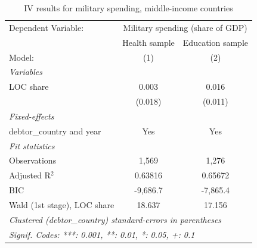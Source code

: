 
\begin{table}[htbp]
   \caption{\label{tab:results_iv_unrel_outcome_other} IV results for military spending, middle-income countries}
   \centering
   \begin{tabular}{lcc}
      \tabularnewline \midrule \midrule
      Dependent Variable: & \multicolumn{2}{c}{Military spending (share of GDP)}\\
                                  & Health sample & Education sample \\   
      Model:                      & (1)           & (2)\\  
      \midrule
      \emph{Variables}\\
      LOC share                   & 0.003         & 0.016\\   
                                  & (0.018)       & (0.011)\\   
      \midrule
      \emph{Fixed-effects}\\
      debtor\_country and year    & Yes           & Yes\\  
      \midrule
      \emph{Fit statistics}\\
      Observations                & 1,569         & 1,276\\  
      Adjusted R$^2$              & 0.63816       & 0.65672\\  
      BIC                         & -9,686.7      & -7,865.4\\  
      Wald (1st stage), LOC share & 18.637        & 17.156\\  
      \midrule \midrule
      \multicolumn{3}{l}{\emph{Clustered (debtor\_country) standard-errors in parentheses}}\\
      \multicolumn{3}{l}{\emph{Signif. Codes: ***: 0.001, **: 0.01, *: 0.05, +: 0.1}}\\
   \end{tabular}
\end{table}


